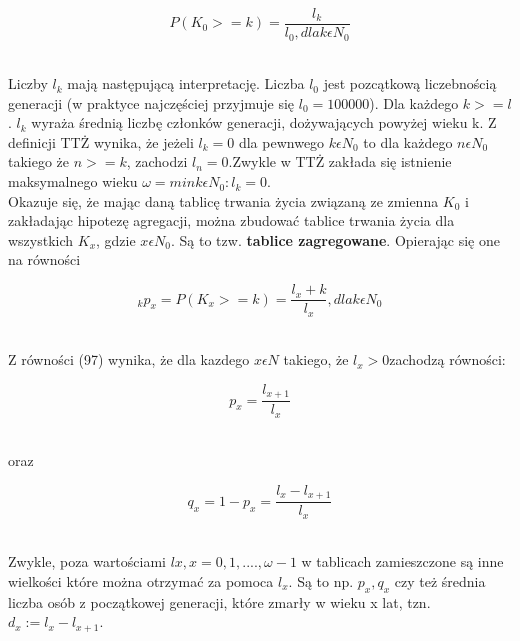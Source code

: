 \documentclass{article}
\begin{document}
\begin{center}
	\begin{equation}
		P(K_0 >= k) = \frac{l_k}{l_0, dla k \epsilon N_0}
	\end{equation}
\end{center}\\

Liczby $ l_k $ mają następującą interpretację. Liczba $ l_0 $ jest pozcątkową liczebnością generacji (w praktyce najczęściej przyjmuje się $ l_0 = 100000 $). Dla każdego $ k >= l $. $ l_k $ wyraża średnią liczbę członków generacji, dożywających powyżej wieku k. Z definicji TTŻ wynika, że jeżeli $ l_k = 0 $ dla pewnwego $ k \epsilon N_0 $ to dla każdego $ n \epsilon N_0 $ takiego że $ n >= k $, zachodzi $ l_n = 0 $.Zwykle w TTŻ zakłada się istnienie maksymalnego wieku $ \omega = min{k \epsilon N_0 : l_k = 0} $. \\

Okazuje się, że mając daną tablicę trwania życia związaną ze zmienna $ K_0 $ i zakładając hipotezę agregacji, można zbudować tablice trwania życia dla wszystkich $ K_x $, gdzie $ x \epsilon N_0 $. Są to tzw. \textbf{tablice zagregowane}. Opierając się one na równości

\begin{center}
	\begin{equation}
		_kp_x = P(K_x >= k) = \frac{l_x + k}{l_x}, dla k \epsilon N_0
	\end{equation}
\end{center}\\

Z równości (97) wynika, że dla kazdego $ x \epsilon N $ takiego, że $ l_x > 0 $zachodzą równości:

\begin{center}
	\begin{equation}
		p_x = \frac{l_{x+1}}{l_x}
	\end{equation}
\end{center}\\

oraz\\

\begin{center}
	\begin{equation}
		q_x = 1 - p_x = \frac{l_x - l_{x+1}}{l_x}
	\end{equation}
\end{center}\\

Zwykle, poza wartościami $ lx, x = 0,1,...., \omega - 1 $ w tablicach zamieszczone są inne wielkości które można otrzymać za pomoca $ l_x $. Są to np. $ p_x, q_x $ czy też średnia liczba osób z początkowej generacji, które zmarły w wieku x lat, tzn. $ d_x := l_x - l_{x+1} $. \\
\end{document}
